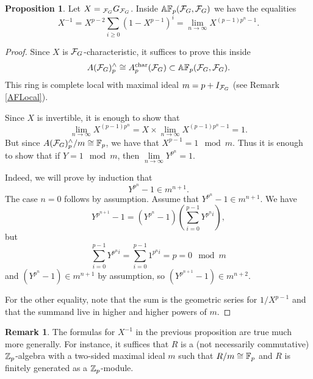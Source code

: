 \documentclass[10pt]{amsart}
\theoremstyle{definition}
\newtheorem{proposition}[theorem]{Proposition}
\newtheorem{remark}[theorem]{Remark}
\begin{document}





\begin{proposition}\label{inverseFormula}
Let $X = {}_{\mathcal{F}_G}G_{\mathcal{F}_G}$. Inside $\mathbb{A} \mathbb{F}_p(\mathcal{F}_G,\mathcal{F}_G)$ we have the equalities
\[
X^{-1} = X^{p-2}\sum_{i \geq 0} (1-X^{p-1})^{i} = \lim_{n \to \infty} X^{(p-1)p^n-1}.
\]
\end{proposition}
\begin{proof}
Since $X$ is $\mathcal{F}_G$-characteristic, it suffices to prove this inside
\[
A(\mathcal{F}_G)^{\wedge}_{p} \cong A^{\text{char}}_{p}(\mathcal{F}_G) \subset \mathbb{A} \mathbb{F}_p(\mathcal{F}_G,\mathcal{F}_G).
\]
This ring is complete local with maximal ideal $m = p + I_{\mathcal{F}_G}$ (see Remark \ref{AFLocal}).

Since $X$ is invertible, it is enough to show that
\[
\lim_{n \to \infty} X^{(p-1)p^n}= X \times \lim_{n \to \infty} X^{(p-1)p^n-1} = 1.
\]
But since $A(\mathcal{F}_G)^{\wedge}_{p}/m \cong \mathbb{F}_p$, we have that $X^{p-1} = 1 \mod m$. Thus it is enough to show that if $Y=1 \mod m$, then $\lim\limits_{n \to \infty} Y^{p^n}=1$.

Indeed, we will prove by induction that
\[
Y^{p^n}-1 \in m^{n+1}.
\]
The case $n=0$ follows by assumption. Assume that $Y^{p^n}-1 \in m^{n+1}$. We have
\[
Y^{p^{n+1}}-1  = (Y^{p^n}-1)(\sum^{p-1}_{i=0} Y^{p^ni}),
\]
but
\[
\sum^{p-1}_{i=0} Y^{p^ni} = \sum^{p-1}_{i=0} 1^{p^ni} =p =0 \mod m
\]
and $(Y^{p^n}-1)\in m^{n+1}$ by assumption, so $(Y^{p^{n+1}}-1)\in m^{n+2}$.

For the other equality, note that the sum is the geometric series for $1/X^{p-1}$ and that the summand live in higher and higher powers of $m$.
\end{proof}

\begin{remark}
The formulas for $X^{-1}$ in the previous proposition are true much more generally. For instance, it suffices that $R$ is a (not necessarily commutative) $\mathbb{Z}_p$-algebra with a two-sided maximal ideal $m$ such that $R/m \cong \mathbb{F}_p$ and $R$ is finitely generated as a $\mathbb{Z}_p$-module.
\end{remark}
\end{document}
